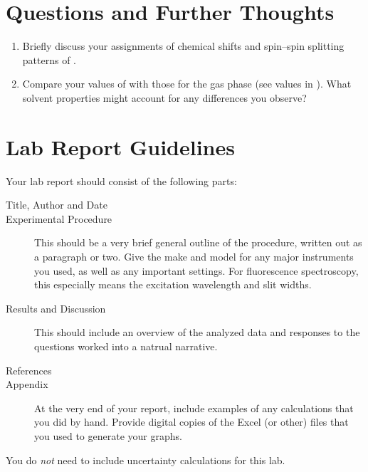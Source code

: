 
\section{Questions and Further Thoughts} %
\label{sec:questions_and_further_thoughts}

\begin{enumerate}
	\item Briefly discuss your assignments of chemical shifts and spin--spin splitting patterns of . 
	\item Compare your values of  with those for the gas phase (see values in \textcite{jarek97nmr}).
	What solvent properties might account for any differences you observe?
\end{enumerate}


\section{Lab Report Guidelines} %
\label{sec:lab_report_guidelines}

Your lab report should consist of the following parts:
\begin{description}
	\item[Title, Author and Date]
	\item[Experimental Procedure] This should be a very brief general outline of the procedure, written out as a paragraph or two. Give the make and model for any major instruments you used, as well as any important settings. For fluorescence spectroscopy, this especially means the excitation wavelength and slit widths.
	\item[Results and Discussion] This should include an overview of the analyzed data and responses to the questions worked into a natrual narrative.
	\item[References]
	\item[Appendix] At the very end of your report, include examples of any calculations that you did by hand. 
	Provide digital copies of the Excel (or other) files that you used to generate your graphs.
\end{description}

\noindent You do \emph{not} need to include uncertainty calculations for this lab. 

